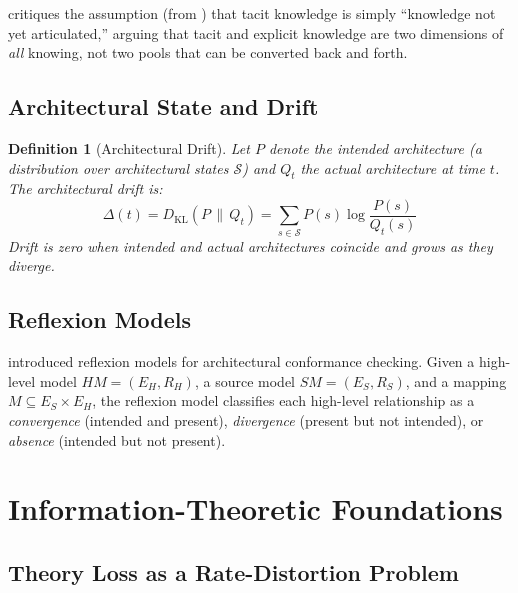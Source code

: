 \documentclass[11pt, a4paper, logo, copyright]{googledeepmind}
\newtheorem{definition}{Definition}[section]
\begin{document}
\citet{tsoukas2003} critiques the assumption (from \citealt{nonaka1995}) that tacit knowledge is simply ``knowledge not yet articulated,'' arguing that tacit and explicit knowledge are two dimensions of \emph{all} knowing, not two pools that can be converted back and forth.

\subsection{Architectural State and Drift}

\begin{definition}[Architectural Drift]
\label{def:drift}
Let $P$ denote the intended architecture (a distribution over architectural states $\mathcal{S}$) and $Q_t$ the actual architecture at time $t$. The \emph{architectural drift} is:
\begin{equation}
    \Delta(t) = D_{\mathrm{KL}}(P \,\|\, Q_t) = \sum_{s \in \mathcal{S}} P(s) \log \frac{P(s)}{Q_t(s)}
\end{equation}
Drift is zero when intended and actual architectures coincide and grows as they diverge.
\end{definition}

\subsection{Reflexion Models}

\citet{murphy1995, murphy2001} introduced reflexion models for architectural conformance checking. Given a high-level model $HM = (E_H, R_H)$, a source model $SM = (E_S, R_S)$, and a mapping $M \subseteq E_S \times E_H$, the reflexion model classifies each high-level relationship as a \emph{convergence} (intended and present), \emph{divergence} (present but not intended), or \emph{absence} (intended but not present).


\section{Information-Theoretic Foundations}
\label{sec:info-theory}

\subsection{Theory Loss as a Rate-Distortion Problem}
\end{document}
